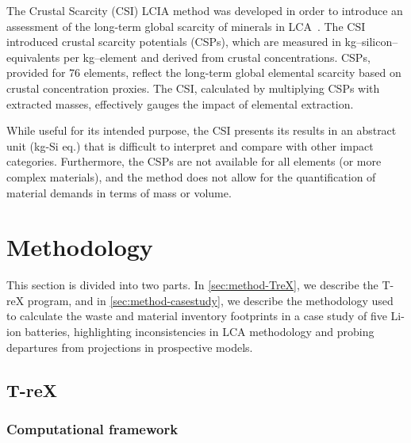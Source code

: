\documentclass[a4paper,fleqn]{cas-dc}
\begin{document}
	The Crustal Scarcity (CSI) LCIA method was developed in order to introduce an
	assessment of the long-term global scarcity of minerals in
	LCA~\citep{arvidsson2020csi}. The CSI introduced crustal scarcity potentials
	(CSPs), which are measured in kg–silicon–equivalents per kg–element and
	derived from crustal concentrations. CSPs, provided for 76 elements, reflect
	the long-term global elemental scarcity based on crustal concentration proxies.
	The CSI, calculated by multiplying CSPs with extracted masses, effectively
	gauges the impact of elemental extraction.
	
	While useful for its intended purpose, the CSI presents its results in an
	abstract unit (kg-Si eq.) that is difficult to interpret and compare with other
	impact categories. Furthermore, the CSPs are not available for all elements (or
	more complex materials), and the method does not allow for the quantification
	of material demands in terms of mass or volume.
	
	
	\section{Methodology}\label{sec:methodology}
	
	This section is divided into two parts. In \autoref{sec:method-TreX}, we
	describe the T-reX program, and in \autoref{sec:method-casestudy}, we describe
	the methodology used to calculate the waste and material inventory footprints
	in a case study of five Li-ion batteries, highlighting inconsistencies in LCA
	methodology and probing departures from projections in prospective models.
	
	\subsection{T-reX}\label{sec:method-TreX}
	
	\subsubsection{Computational framework}
	
\end{document}

